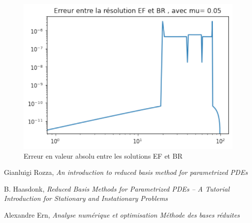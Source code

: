 \documentclass[12pt]{article}
\begin{document}
\begin{figure}[ht]
\begin{center}
\includegraphics[scale=1]{err_br_ef.pdf}
\caption[]{Erreur en valeur absolu entre les solutions EF et BR }
\end{center}
\end{figure}


\newpage

\begin{thebibliography}{9}


Gianluigi Rozza,  \emph{An introduction to reduced basis method for parametrized PDEs
 }

B. Haasdonk,  \emph{Reduced Basis Methods for Parametrized PDEs –
A Tutorial Introduction for Stationary and
Instationary Problems }


Alexandre Ern,  \emph{ Analyse numérique et optimisation
Méthode des bases réduites }



\end{thebibliography}
\end{document}
